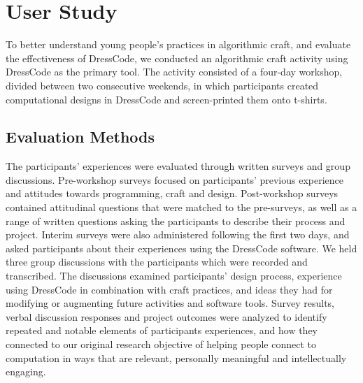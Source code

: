 \documentclass{sigchi}
\begin{document}
\section{User Study}
To better understand young people's practices in algorithmic craft, and evaluate the effectiveness of DressCode, we conducted an algorithmic craft activity using DressCode as the primary tool. The activity consisted of a four-day workshop, divided between two consecutive weekends, in which participants created computational designs in DressCode and screen-printed them onto t-shirts.

\subsection{Evaluation Methods}
The participants' experiences were evaluated through written surveys and group discussions. Pre-workshop surveys focused on participants' previous experience and attitudes towards programming, craft and design. Post-workshop surveys contained attitudinal questions that were matched to the pre-surveys, as well as a range of written questions asking the participants to describe their process and project. Interim surveys were also administered following the first two days, and asked participants about their experiences using the DressCode software. We held three group discussions with the participants which were recorded and transcribed. The discussions examined participants' design process, experience using DressCode in combination with craft practices, and ideas they had for modifying or augmenting future activities and software tools. Survey results, verbal discussion responses and project outcomes were analyzed to identify repeated and notable elements of participants experiences, and how they connected to our original research objective of helping people connect to computation in ways that are relevant, personally meaningful and intellectually engaging.
\end{document}
